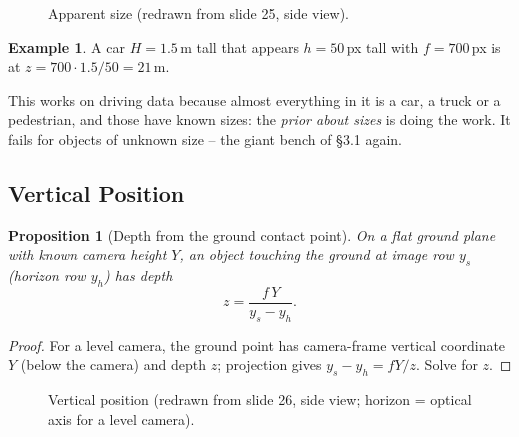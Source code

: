 \documentclass[11pt,a4paper]{article}
\theoremstyle{definition}
\newtheorem{example}[definition]{Example}
\theoremstyle{plain}
\newtheorem{proposition}[definition]{Proposition}
\theoremstyle{remark}
\begin{document}
\begin{figure}[htbp]
\centering
{}
\caption{Apparent size (redrawn from slide 25, side view).}
\end{figure}
 
\begin{example}
A car $H=1.5$\,m tall that appears $h=50$\,px tall with $f=700$\,px is at $z=700\cdot1.5/50=21$\,m.
\end{example}
 
\begin{intuition}
This works on driving data because almost everything in it is a car, a truck or a pedestrian, and those have known sizes: the \emph{prior about sizes} is doing the work. It fails for objects of unknown size -- the giant bench of \S3.1 again.
\end{intuition}
 
\subsection{Vertical Position }
 
\begin{proposition}[Depth from the ground contact point]\label{prop:vertical}
On a flat ground plane with known camera height $Y$, an object touching the ground at image row $y_s$ (horizon row $y_h$) has depth
\[
z=\frac{f\,Y}{y_s-y_h}.
\]
\end{proposition}
\begin{proof}
For a level camera, the ground point has camera-frame vertical coordinate $Y$ (below the camera) and depth $z$; projection gives $y_s-y_h=fY/z$. Solve for $z$. \qedhere
\end{proof}
 
\begin{figure}[htbp]
\centering
{}
\caption{Vertical position (redrawn from slide 26, side view; horizon = optical axis for a level camera).}
\end{figure}
 
\end{document}

